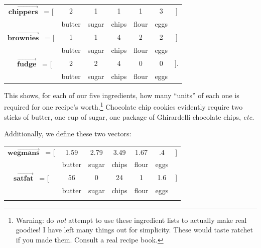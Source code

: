 
\begin{center}
\begin{tabular}{ccccccc}
$\overrightarrow{\textbf{chippers}}$ \ = [ & 2 & 1 & 1 & 1 & 3 &] \\
& \scriptsize{butter} & \scriptsize{sugar} & \scriptsize{chips} &
\scriptsize{flour} & \scriptsize{eggs} \smallskip \\
$\overrightarrow{\textbf{brownies}}$ \ = [ & 1 & 1 & 4 & 2 & 2 &] \\
& \scriptsize{butter} & \scriptsize{sugar} & \scriptsize{chips} &
\scriptsize{flour} & \scriptsize{eggs} \smallskip \\
\ \ $\overrightarrow{\textbf{fudge}}$ \quad \ = [ & 2 & 2 & 4 & 0 & 0 &]. \\
& \scriptsize{butter} & \scriptsize{sugar} & \scriptsize{chips} &
\scriptsize{flour} & \scriptsize{eggs} \bigskip \\
\end{tabular}
\end{center}
\vspace{-.05in}

This shows, for each of our five ingredients, how many ``units'' of each one is
required for one recipe's worth.\footnote{Warning: do \textit{not} attempt to
use these ingredient lists to actually make real goodies! I have left many
things out for simplicity. These would taste ratchet if you made them. Consult
a real recipe book.} Chocolate chip cookies evidently require two sticks of
butter, one cup of sugar, one package of Ghirardelli chocolate chips,
\textit{etc.}

\medskip

Additionally, we define these two vectors:

\begin{center}
\begin{tabular}{ccccccc}
$\overrightarrow{\textbf{wegmans}}$ \quad \ = [ & 1.59 & 2.79 & 3.49 & 1.67 &
.4 &] \\
& \scriptsize{butter} & \scriptsize{sugar} & \scriptsize{chips} &
\scriptsize{flour} & \scriptsize{eggs} \medskip \\
$\overrightarrow{\textbf{satfat}}$ \quad \ = [ & 56 & 0 & 24 & 1 & 1.6 &] \\
& \scriptsize{butter} & \scriptsize{sugar} & \scriptsize{chips} &
\scriptsize{flour} & \scriptsize{eggs} \medskip \\
\normalsize
\end{tabular}
\end{center}
\vspace{-.15in}


